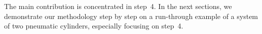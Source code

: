 \begin{bibunit}
The main contribution is concentrated in step~4.
In the next sections, we demonstrate our methodology step by step on a run-through example of a system of two pneumatic cylinders, especially focusing on step~4.






\end{bibunit}
